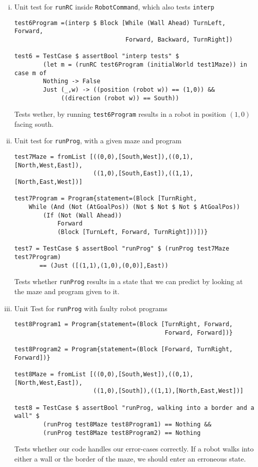 \documentclass[a4paper,10pt]{article}
\begin{document}
\begin{enumerate}[i.]
\item Unit test for \verb=runRC= inside \verb=RobotCommand=, which also tests \verb=interp=
\begin{verbatim}
test6Program =(interp $ Block [While (Wall Ahead) TurnLeft, Forward, 
                               Forward, Backward, TurnRight])

test6 = TestCase $ assertBool "interp tests" $ 
        (let m = (runRC test6Program (initialWorld test1Maze)) in case m of
        Nothing -> False 
        Just (_,w) -> ((position (robot w)) == (1,0)) && 
             ((direction (robot w)) == South))
\end{verbatim}
Tests wether, by running \verb=test6Program= results in a robot in position $(1,0)$ facing south.

\item Unit test for \verb=runProg=, with a given maze and program
\begin{verbatim}
test7Maze = fromList [((0,0),[South,West]),((0,1),[North,West,East]),
                      ((1,0),[South,East]),((1,1),[North,East,West])]

test7Program = Program{statement=(Block [TurnRight,
    While (And (Not (AtGoalPos)) (Not $ Not $ Not $ AtGoalPos))
        (If (Not (Wall Ahead))
            Forward
            (Block [TurnLeft, Forward, TurnRight]))])} 

test7 = TestCase $ assertBool "runProg" $ (runProg test7Maze test7Program)
       == (Just ([(1,1),(1,0),(0,0)],East))
\end{verbatim}
Tests whether \verb=runProg= results in a state that we can predict by looking at the maze and program given to it.

\item Unit Test for \verb=runProg= with faulty robot programs
\begin{verbatim}
test8Program1 = Program{statement=(Block [TurnRight, Forward, 
                                          Forward, Forward])}

test8Program2 = Program{statement=(Block [Forward, TurnRight, Forward])}

test8Maze = fromList [((0,0),[South,West]),((0,1),[North,West,East]),
                      ((1,0),[South]),((1,1),[North,East,West])]

test8 = TestCase $ assertBool "runProg, walking into a border and a wall" $
        (runProg test8Maze test8Program1) == Nothing &&
        (runProg test8Maze test8Program2) == Nothing
\end{verbatim}
Tests whether our code handles our error-cases correctly. If a robot walks into either a wall or the border of the maze, we should enter an erroneous state.
\end{enumerate}
\end{document}
